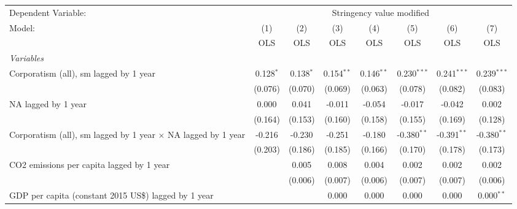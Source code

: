 
\begingroup
\centering
\begin{tabular}{lccccccc}
   \toprule
   Dependent Variable: & \multicolumn{7}{c}{Stringency value modified}\\
   Model:                                                               & (1)         & (2)         & (3)          & (4)            & (5)            & (6)            & (7)\\  
                                                                        &  OLS        & OLS         & OLS          & OLS            & OLS            & OLS            & OLS\\  
   \midrule
   \emph{Variables}\\
   Corporatism (all), sm lagged by 1 year                               & 0.128$^{*}$ & 0.138$^{*}$ & 0.154$^{**}$ & 0.146$^{**}$   & 0.230$^{***}$  & 0.241$^{***}$  & 0.239$^{***}$\\   
                                                                        & (0.076)     & (0.070)     & (0.069)      & (0.063)        & (0.078)        & (0.082)        & (0.083)\\   
   NA lagged by 1 year                                                  & 0.000       & 0.041       & -0.011       & -0.054         & -0.017         & -0.042         & 0.002\\   
                                                                        & (0.164)     & (0.153)     & (0.160)      & (0.158)        & (0.155)        & (0.169)        & (0.128)\\   
   Corporatism (all), sm lagged by 1 year $\times$ NA lagged by 1 year  & -0.216      & -0.230      & -0.251       & -0.180         & -0.380$^{**}$  & -0.391$^{**}$  & -0.380$^{**}$\\   
                                                                        & (0.203)     & (0.186)     & (0.185)      & (0.166)        & (0.170)        & (0.178)        & (0.173)\\   
   CO2 emissions per capita lagged by 1 year                            &             & 0.005       & 0.008        & 0.004          & 0.002          & 0.002          & 0.002\\   
                                                                        &             & (0.006)     & (0.007)      & (0.006)        & (0.007)        & (0.007)        & (0.006)\\   
   GDP per capita (constant 2015 US\$) lagged by 1 year                 &             &             & 0.000        & 0.000          & 0.000          & 0.000          & 0.000$^{**}$\\   

\end{tabular}
